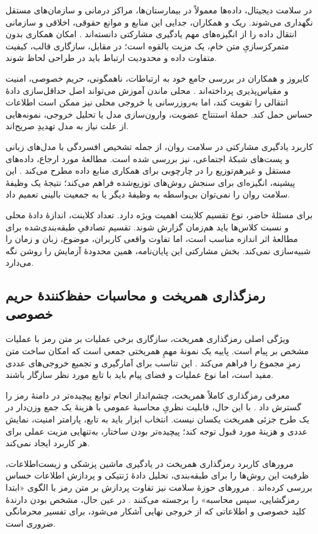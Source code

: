 در سلامت دیجیتال، داده‌ها معمولاً در بیمارستان‌ها، مراکز درمانی و سازمان‌های مستقل نگهداری می‌شوند. ریک و همکاران، جدایی این منابع و موانع حقوقی، اخلاقی و سازمانی انتقال داده را از انگیزه‌های مهم یادگیری مشارکتی دانسته‌اند \cite{ref16}. امکان همکاری بدون متمرکزسازیِ متن خام، یک مزیت بالقوه است؛ در مقابل، سازگاری قالب، کیفیت متفاوت داده و محدودیت ارتباط باید در طراحی لحاظ شوند.

کایروز و همکاران در بررسی جامع خود به ارتباطات، ناهمگونی، حریم خصوصی، امنیت و مقیاس‌پذیری پرداخته‌اند \cite{ref17}. محلی ماندن آموزش می‌تواند اصل حداقل‌سازی دادۀ انتقالی را تقویت کند، اما به‌روزرسانی یا خروجی محلی نیز ممکن است اطلاعات حساس حمل کند. حملۀ استنتاج عضویت، وارون‌سازی مدل یا تحلیل خروجی، نمونه‌هایی از علت نیاز به مدل تهدیدِ صریح‌اند.

کاربرد یادگیری مشارکتی در سلامت روان، از جمله تشخیص افسردگی با مدل‌های زبانی و پست‌های شبکۀ اجتماعی، نیز بررسی شده است. مطالعۀ مورد ارجاع، داده‌های مستقل و غیرهم‌توزیع را در چارچوبی برای همکاری منابع داده مطرح می‌کند \cite{ref18}. این پیشینه، انگیزه‌ای برای سنجش روش‌های توزیع‌شده فراهم می‌کند؛ نتیجۀ یک وظیفۀ سلامت روان را نمی‌توان بی‌واسطه به وظیفۀ دیگر یا به جمعیت بالینی تعمیم داد.

برای مسئلۀ حاضر، نوع تقسیم کلاینت اهمیت ویژه دارد. تعداد کلاینت، اندازۀ دادۀ محلی و نسبت کلاس‌ها باید هم‌زمان گزارش شوند. تقسیم تصادفیِ طبقه‌بندی‌شده برای مطالعۀ اثر اندازه مناسب است، اما تفاوت واقعی کاربران، موضوع، زبان و زمان را شبیه‌سازی نمی‌کند. بخش مشارکتی این پایان‌نامه، همین محدودۀ آزمایش را روشن نگه می‌دارد.

\subsection{رمزگذاری همریخت و محاسبات حفظ‌کنندۀ حریم خصوصی}
ویژگی اصلی رمزگذاری همریخت، سازگاری برخی عملیات بر متن رمز با عملیات مشخص بر پیام است. پاییه یک نمونۀ مهمِ همریختی جمعی است که امکان ساخت متن رمزِ مجموع را فراهم می‌کند \cite{ref19}. این تناسب برای آمارگیری و تجمیع خروجی‌های عددی مفید است، اما نوع عملیات و فضای پیام باید با تابع مورد نظر سازگار باشند.

معرفی رمزگذاری کاملاً همریخت، چشم‌انداز انجام توابع پیچیده‌تر در دامنۀ رمز را گسترش داد \cite{ref20}. با این حال، قابلیت نظریِ محاسبۀ عمومی با هزینۀ یک جمع وزن‌دار در یک طرح جزئی همریخت یکسان نیست. انتخاب ابزار باید به تابع، پارامتر امنیت، نمایش عددی و هزینۀ مورد قبول توجه کند؛ پیچیده‌تر بودن ساختار، به‌تنهایی مزیت عملی برای هر کاربرد ایجاد نمی‌کند.

مرورهای کاربرد رمزگذاری همریخت در یادگیری ماشین پزشکی و زیست‌اطلاعات، ظرفیت این روش‌ها را برای طبقه‌بندی، تحلیل دادۀ ژنتیکی و پردازش اطلاعات حساس بررسی کرده‌اند \cite{ref21}. مرورهای حوزۀ سلامت نیز تفاوت پردازش بر متن رمز با الگوی «ابتدا رمزگشایی، سپس محاسبه» را برجسته می‌کنند \cite{ref22}. در عین حال، مشخص بودن دارندۀ کلید خصوصی و اطلاعاتی که از خروجی نهایی آشکار می‌شود، برای تفسیر محرمانگی ضروری است.

